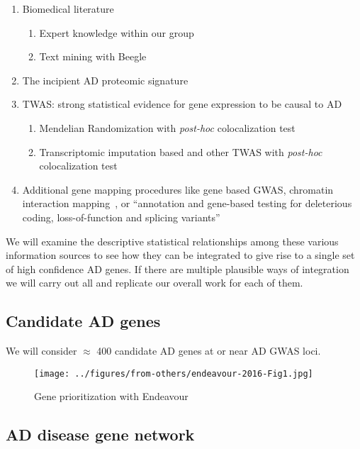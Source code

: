 \documentclass[letterpaper]{article}
\begin{document}
\begin{enumerate}
\item Biomedical literature
\begin{enumerate}
	\item Expert knowledge within our group
	\item Text mining with Beegle~\citep{ElShal2016}
\end{enumerate}
\item The incipient AD proteomic signature~\citep{JacksonA.Roberts2021}
\item TWAS: strong statistical evidence for gene expression to be causal to AD
\begin{enumerate}
	\item Mendelian Randomization with \emph{post-hoc} colocalization test~\citep{Baird2021,Kunkle2019}
	\item Transcriptomic imputation based and other TWAS with \emph{post-hoc}
		colocalization test~\citep{Gerring2020,Jansen2019}
\end{enumerate}
\item Additional gene mapping procedures like gene based GWAS, chromatin
	interaction mapping~\citep{Jansen2019}, or ``annotation and gene-based testing for deleterious
	coding, loss-of-function and splicing variants''~\citep{Kunkle2019}
\end{enumerate}

We will examine the descriptive statistical relationships among these various information
sources to see how they can be integrated to give rise to a single set of high
confidence AD genes.  If there are multiple plausible ways of integration we
will carry out all and replicate our overall work for each of them.

\subsection{Candidate AD genes}

We will consider $\approx$ 400 candidate AD genes at or near AD GWAS loci.

\begin{figure}
\texttt{[image: ../figures/from-others/endeavour-2016-Fig1.jpg]}
\caption{Gene prioritization with Endeavour \citep{Tranchevent2016}}
\label{fig:endeavour}
\end{figure}

\subsection{AD disease gene network}
\end{document}
